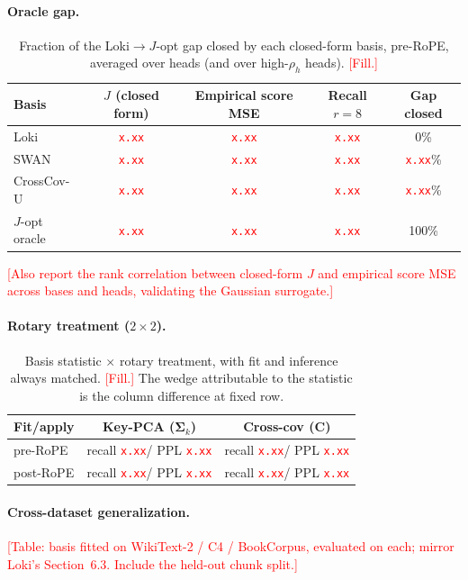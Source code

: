 \documentclass[10pt]{article}
\newcommand{\TODO}[1]{\textcolor{red}{[#1]}}
\newcommand{\NUM}{\textcolor{red}{\texttt{x.xx}}}
\newcommand{\bC}{\mathbf{C}}
\newcommand{\Sk}{\bm{\Sigma}_k}
\newcommand{\method}{CrossCov-U}
\theoremstyle{plain}
\theoremstyle{definition}
\theoremstyle{remark}
\begin{document}
\paragraph{Oracle gap.}
\begin{table}[h]
\centering
\caption{Fraction of the Loki$\to$$J$-opt gap closed by each closed-form basis, pre-RoPE, averaged over heads (and over high-$\rho_h$ heads). \TODO{Fill.}}
\label{tab:oracle}
\begin{tabular}{lcccc}
\toprule
Basis & $J$ (closed form) & Empirical score MSE & Recall $r{=}8$ & Gap closed \\
\midrule
Loki & \NUM & \NUM & \NUM & 0\% \\
SWAN & \NUM & \NUM & \NUM & \NUM\% \\
\method{} & \NUM & \NUM & \NUM & \NUM\% \\
$J$-opt oracle & \NUM & \NUM & \NUM & 100\% \\
\bottomrule
\end{tabular}
\end{table}
\TODO{Also report the rank correlation between closed-form $J$ and empirical
score MSE across bases and heads, validating the Gaussian surrogate.}

\paragraph{Rotary treatment ($2\times2$).}
\begin{table}[h]
\centering
\caption{Basis statistic $\times$ rotary treatment, with fit and inference always matched. \TODO{Fill.} The wedge attributable to the statistic is the column difference at fixed row.}
\label{tab:rope}
\begin{tabular}{lcc}
\toprule
Fit/apply & Key-PCA ($\Sk$) & Cross-cov ($\bC$) \\
\midrule
pre-RoPE  & recall \NUM / PPL \NUM & recall \NUM / PPL \NUM \\
post-RoPE & recall \NUM / PPL \NUM & recall \NUM / PPL \NUM \\
\bottomrule
\end{tabular}
\end{table}

\paragraph{Cross-dataset generalization.}
\TODO{Table: basis fitted on WikiText-2 / C4 / BookCorpus, evaluated on each;
mirror Loki's Section~6.3. Include the held-out chunk split.}
\end{document}

